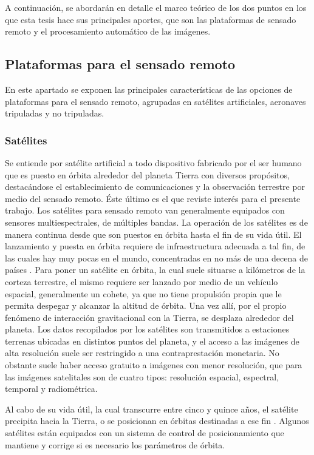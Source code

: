 A continuación, se abordarán en detalle el marco teórico de los dos puntos en los que esta tesis hace sus principales aportes, que son las plataformas de sensado remoto y el procesamiento automático de las imágenes.

\subsection{Plataformas para el sensado remoto}
En este apartado se exponen las principales características de las opciones de plataformas para el sensado remoto, agrupadas en satélites artificiales, aeronaves tripuladas y no tripuladas.
\subsubsection{Satélites}

Se entiende por satélite artificial a todo dispositivo fabricado por el ser humano que es puesto en órbita alrededor del planeta Tierra con diversos propósitos, destacándose el establecimiento de comunicaciones y la observación terrestre por medio del sensado remoto. Éste último es el que reviste interés para el presente trabajo. Los satélites para sensado remoto van generalmente equipados con sensores multiespectrales, de múltiples bandas. La operación de los satélites es de manera continua desde que son puestos en órbita hasta el fin de su vida útil. El lanzamiento y puesta en órbita requiere de infraestructura adecuada a tal fin, de las cuales hay muy pocas en el mundo, concentradas en no más de una decena de países \cite{noauthor_que_nodate}. Para poner un satélite en órbita, la cual suele situarse a kilómetros de la corteza terrestre, el mismo requiere ser lanzado por medio de un vehículo espacial, generalmente un cohete, ya que no tiene propulsión propia que le permita despegar y alcanzar la altitud de órbita. Una vez allí, por el propio fenómeno de interacción gravitacional con la Tierra, se desplaza alrededor del planeta.
Los datos recopilados por los satélites son transmitidos a estaciones terrenas ubicadas en distintos puntos del planeta, y el acceso a las imágenes de alta resolución suele ser restringido a una contraprestación monetaria. No obstante suele haber acceso gratuito a imágenes con menor resolución, que para las imágenes satelitales son de cuatro tipos: resolución espacial, espectral, temporal y radiométrica.

Al cabo de su vida útil, la cual transcurre entre cinco y quince años, el satélite precipita hacia la Tierra, o se posicionan en órbitas destinadas a ese fin \cite{noauthor_keeping_nodate}. Algunos satélites están equipados con un sistema de control de posicionamiento que mantiene y corrige si es necesario los parámetros de órbita.

